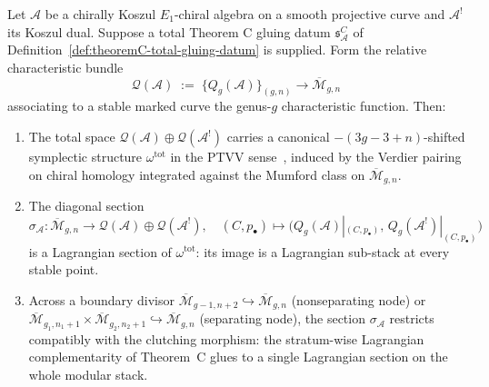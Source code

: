 \begin{theorem}
\label{thm:theoremC-total-shifted-symplectic}
Let $\mathcal{A}$ be a chirally Koszul $E_1$-chiral algebra on a
smooth projective curve and $\mathcal{A}^!$ its Koszul dual. Suppose a
total Theorem C gluing datum
\(\mathfrak s_{\mathcal A}^{C}\) of
Definition~\ref{def:theoremC-total-gluing-datum} is supplied. Form
the relative characteristic bundle
\[
 \mathcal{Q}(\mathcal{A}) \;:=\;
 \bigl\{Q_g(\mathcal{A})\bigr\}_{(g,n)} \longrightarrow
 \overline{\mathcal{M}}_{g,n}
\]
associating to a stable marked curve the genus-$g$ characteristic
function. Then:
\begin{enumerate}
\item\label{tsc-i} The total space
 $\mathcal{Q}(\mathcal{A}) \oplus \mathcal{Q}(\mathcal{A}^!)$
 carries a canonical $-(3g{-}3{+}n)$-shifted symplectic structure
 $\omega^{\mathrm{tot}}$ in the PTVV
 sense~\cite{PTVV13}, induced by the Verdier pairing on chiral
 homology integrated against the Mumford class on
 $\overline{\mathcal{M}}_{g,n}$.
\item\label{tsc-ii} The diagonal section
 $\sigma_{\mathcal{A}}\colon
 \overline{\mathcal{M}}_{g,n} \longrightarrow
 \mathcal{Q}(\mathcal{A}) \oplus \mathcal{Q}(\mathcal{A}^!),
 \quad
 (C, p_\bullet) \mapsto
 \bigl(Q_g(\mathcal{A})|_{(C,p_\bullet)},\,
 Q_g(\mathcal{A}^!)|_{(C,p_\bullet)}\bigr)$
 is a Lagrangian section of $\omega^{\mathrm{tot}}$: its image is a
 Lagrangian sub-stack at every stable point.
\item\label{tsc-iii} Across a boundary divisor
 $\overline{\mathcal{M}}_{g-1,n+2} \hookrightarrow
 \overline{\mathcal{M}}_{g,n}$ (nonseparating node) or
 $\overline{\mathcal{M}}_{g_1,n_1+1} \times
 \overline{\mathcal{M}}_{g_2,n_2+1}
 \hookrightarrow \overline{\mathcal{M}}_{g,n}$ (separating node),
 the section $\sigma_{\mathcal{A}}$ restricts compatibly with the
 clutching morphism: the stratum-wise Lagrangian complementarity
 of Theorem~C glues to a single Lagrangian section on the whole
 modular stack.
\end{enumerate}
\end{theorem}

